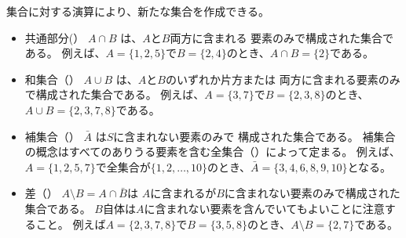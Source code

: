 \begin{samepage}

\begin{comment}
New sets can be constructed using set operations:
\begin{itemize}
\item The \key{intersection} $A \cap B$ consists of elements
that are in both $A$ and $B$.
For example, if $A=\{1,2,5\}$ and $B=\{2,4\}$,
then $A \cap B = \{2\}$.
\item The \key{union} $A \cup B$ consists of elements
that are in $A$ or $B$ or both.
For example, if $A=\{3,7\}$ and $B=\{2,3,8\}$,
then $A \cup B = \{2,3,7,8\}$.
\item The \key{complement} $\bar A$ consists of elements
that are not in $A$.
The interpretation of a complement depends on
the \key{universal set}, which contains all possible elements.
For example, if $A=\{1,2,5,7\}$ and the universal set is
$\{1,2,\ldots,10\}$, then $\bar A = \{3,4,6,8,9,10\}$.
\item The \key{difference} $A \setminus B = A \cap \bar B$
consists of elements that are in $A$ but not in $B$.
Note that $B$ can contain elements that are not in $A$.
For example, if $A=\{2,3,7,8\}$ and $B=\{3,5,8\}$,
then $A \setminus B = \{2,7\}$.
\end{itemize}
\end{comment}

集合に対する演算により、新たな集合を作成できる。
\begin{itemize}
\item 共通部分(） $A \cap B$ は、$A$と$B$両方に含まれる
要素のみで構成された集合である。
例えば、$A=\{1,2,5\}$で$B=\{2,4\}$のとき、$A \cap B = \{2\}$である。
\item 和集合（） $A \cup B$ は、$A$と$B$のいずれか片方または
両方に含まれる要素のみで構成された集合である。
例えば、$A=\{3,7\}$で$B=\{2,3,8\}$のとき、$A \cup B = \{2,3,7,8\}$である。
\item 補集合（） $\bar A$ は$S$に含まれない要素のみで
構成された集合である。
補集合の概念はすべてのありうる要素を含む全集合（）によって定まる。
例えば、$A=\{1,2,5,7\}$で全集合が$\{1,2,\ldots,10\}$のとき、$\bar A = \{3,4,6,8,9,10\}$となる。
\item 差（） $A \setminus B = A \cap \bar B$は
$A$に含まれるが$B$に含まれない要素のみで構成された集合である。
$B$自体は$A$に含まれない要素を含んでいてもよいことに注意すること。
例えば$A=\{2,3,7,8\}$で$B=\{3,5,8\}$のとき、$A \setminus B = \{2,7\}$である。
\end{itemize}

\end{samepage}

